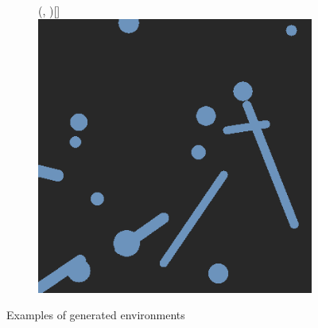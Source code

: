 \begin{figure}[H]
\begin{subfigure}{\w}
{        }
    \end{subfigure}
    \hspace*{\fill}
    \begin{subfigure}{\w}
        \makebox(\textwidth, \textwidth)[\textwidth]{
            \includegraphics[width=\linewidth]{figures/generated-worlds/world_5.png}
        }
    \end{subfigure}
    \caption{Examples of generated environments} \label{fig:generated-enviornments}
\end{figure}


